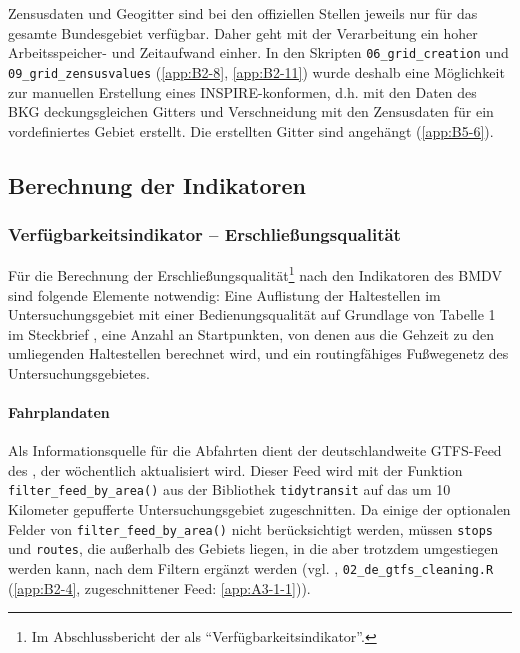 \documentclass[11pt,pdftex,a4paper]{scrartcl}
\begin{document}
	Zensusdaten und Geogitter sind bei den offiziellen Stellen \parencites{statistischeamterdesbundesundderlanderErgebnisseZensus20222022}{BKGGeogitter2026} jeweils nur für das gesamte Bundesgebiet verfügbar. Daher geht mit der Verarbeitung ein hoher Arbeitsspeicher- und Zeitaufwand einher. In den Skripten \texttt{06\_grid\_creation} und \texttt{09\_grid\_zensusvalues} (\ref{app:B2-8}, \ref{app:B2-11}) wurde deshalb eine Möglichkeit zur manuellen Erstellung eines INSPIRE-konformen, d.h. mit den Daten des BKG deckungsgleichen Gitters und Verschneidung mit den Zensusdaten für ein vordefiniertes Gebiet erstellt. Die erstellten Gitter sind angehängt (\ref{app:B5-6}).
	\subsection{Berechnung der Indikatoren}
	\label{sec:indicators}
	\subsubsection{Verfügbarkeitsindikator -- Erschließungsqualität}
	\label{sec:indicErschließung}
	Für die Berechnung der Erschließungsqualität\footnote{Im Abschlussbericht der \textcite{kcwgmbhMethodikUndEmpfehlungen2024} als \enquote{Verfügbarkeitsindikator}.} nach den Indikatoren des BMDV \parencite[25-27]{bmdvIndikatorenLeichtGemacht2025} sind folgende Elemente notwendig: Eine Auflistung der Haltestellen im Untersuchungsgebiet mit einer Bedienungsqualität auf Grundlage von Tabelle 1 im Steckbrief \parencite[27]{bmdvIndikatorenLeichtGemacht2025}, eine Anzahl an Startpunkten, von denen aus die Gehzeit zu den umliegenden Haltestellen berechnet wird, und ein routingfähiges Fußwegenetz des Untersuchungsgebietes.
	\paragraph{Fahrplandaten}
	\label{sec:scheduledates}
	Als Informationsquelle für die Abfahrten dient der deutschlandweite GTFS-Feed des \textcite{delfie.v.DeutschlandweiteSollFahrplandatenGTFS2026}, der wöchentlich aktualisiert wird. Dieser Feed wird mit der Funktion \texttt{filter\_feed\_by\_area()} aus der Bibliothek \texttt{tidytransit} \parencite{polettiTidytransitReadValidate2025} auf das um 10 Kilometer gepufferte Untersuchungsgebiet zugeschnitten. Da einige der optionalen Felder von \texttt{filter\_feed\_by\_area()} nicht berücksichtigt werden, müssen \texttt{stops} und \texttt{routes}, die außerhalb des Gebiets liegen, in die aber trotzdem umgestiegen werden kann, nach dem Filtern ergänzt werden (vgl. \textcite[87]{kcwgmbhMethodikUndEmpfehlungen2024}, \texttt{02\_de\_gtfs\_cleaning.R} (\ref{app:B2-4}, zugeschnittener Feed: \ref{app:A3-1-1})).
	
\end{document}
